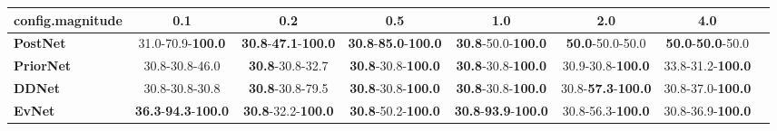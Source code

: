 \begin{tabular}{lccccccc}
\toprule
\textbf{config.magnitude} &                                         0.1 &                                         0.2 &                                         0.5 &                                         1.0 &                                2.0 &                               4.0 \\
\midrule
\textbf{PostNet } &                    31.0-70.9-\textbf{100.0} &  \textbf{30.8}-\textbf{47.1}-\textbf{100.0} &  \textbf{30.8}-\textbf{85.0}-\textbf{100.0} &           \textbf{30.8}-50.0-\textbf{100.0} &            \textbf{50.0}-50.0-50.0 &  \textbf{50.0}-\textbf{50.0}-50.0 \\
\textbf{PriorNet} &                              30.8-30.8-46.0 &                     \textbf{30.8}-30.8-32.7 &           \textbf{30.8}-30.8-\textbf{100.0} &           \textbf{30.8}-30.8-\textbf{100.0} &           30.9-30.8-\textbf{100.0} &          33.8-31.2-\textbf{100.0} \\
\textbf{DDNet   } &                              30.8-30.8-30.8 &                     \textbf{30.8}-30.8-79.5 &           \textbf{30.8}-30.8-\textbf{100.0} &           \textbf{30.8}-30.8-\textbf{100.0} &  30.8-\textbf{57.3}-\textbf{100.0} &          30.8-37.0-\textbf{100.0} \\
\textbf{EvNet   } &  \textbf{36.3}-\textbf{94.3}-\textbf{100.0} &           \textbf{30.8}-32.2-\textbf{100.0} &           \textbf{30.8}-50.2-\textbf{100.0} &  \textbf{30.8}-\textbf{93.9}-\textbf{100.0} &           30.8-56.3-\textbf{100.0} &          30.8-36.9-\textbf{100.0} \\
\bottomrule
\end{tabular}
